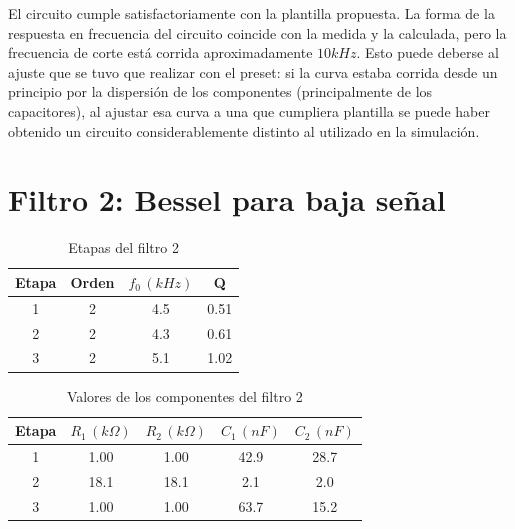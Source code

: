 \documentclass[../../tc_tp5_main.tex]{subfiles}
\begin{document}
El circuito cumple satisfactoriamente con la plantilla propuesta. La forma de la respuesta en frecuencia del circuito coincide con la medida y la calculada, pero la frecuencia de corte est\'a corrida aproximadamente $10kHz$. Esto puede deberse al ajuste que se tuvo que realizar con el preset: si la curva estaba corrida desde un principio por la dispersi\'on de los componentes (principalmente de los capacitores), al ajustar esa curva a una que cumpliera plantilla se puede haber obtenido un circuito considerablemente distinto al utilizado en la simulaci\'on. 

\section{Filtro 2: Bessel para baja se\~nal}


\begin{table}[H]
\centering
\begin{tabular}{|c||c|c|c|}
\hline
Etapa & Orden & $f_0\, (kHz)$ & Q    \\ \hline\hline
1     & 2     & 4.5           & 0.51 \\ \hline
2     & 2     & 4.3           & 0.61 \\ \hline
3     & 2     & 5.1           & 1.02 \\ \hline
\end{tabular}
\caption{Etapas del filtro 2}
\end{table}



\begin{table}[H]
	\centering
\begin{tabular}{|c||c|c|c|c|}
\hline
Etapa & $R_1\, (k\Omega)$ & $R_2\, (k\Omega)$ & $C_1\, (nF)$ & $C_2\, (nF)$ \\ \hline\hline
1     & 1.00              & 1.00              & 42.9         & 28.7         \\ \hline
2     & 18.1              & 18.1              & 2.1          & 2.0          \\ \hline
3     & 1.00              & 1.00              & 63.7         & 15.2         \\ \hline
\end{tabular}
\caption{Valores de los componentes del filtro 2}
\end{table}
\end{document}
